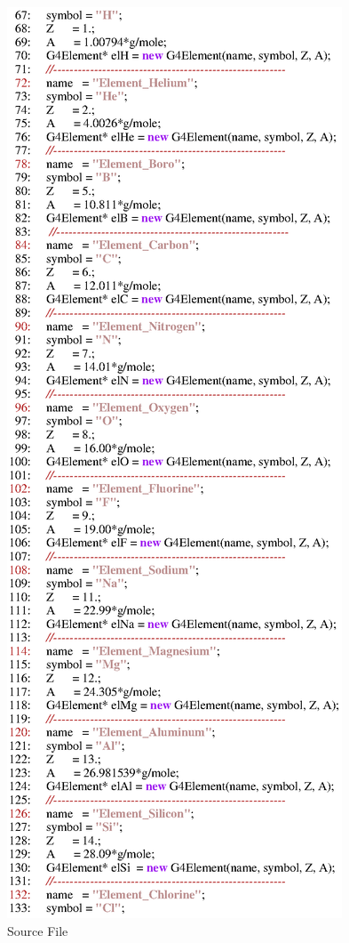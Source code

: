 \begin{figure}[h]
  \hspace{0cm}
  \includegraphics[scale=0.8]{./figures17/QweakSimMaterial.cc-p2.eps}
  \caption{\label{SourceXVII3} Source File}
           \label{fig:XVII-SC-3}
\end{figure}
\clearpage


